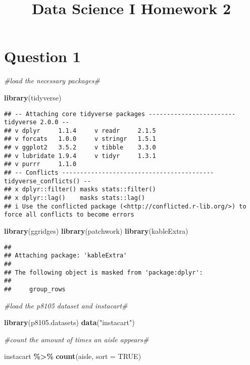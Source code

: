 \documentclass[
]{article}
\title{Data Science I Homework 2}
\author{}
\date{\vspace{-2.5em}}
\newenvironment{Shaded}{\begin{snugshade}}{\end{snugshade}}
\newcommand{\AttributeTok}[1]{\textcolor[rgb]{0.13,0.29,0.53}{#1}}
\newcommand{\CommentTok}[1]{\textcolor[rgb]{0.56,0.35,0.01}{\textit{#1}}}
\newcommand{\ConstantTok}[1]{\textcolor[rgb]{0.56,0.35,0.01}{#1}}
\newcommand{\FunctionTok}[1]{\textcolor[rgb]{0.13,0.29,0.53}{\textbf{#1}}}
\newcommand{\NormalTok}[1]{#1}
\newcommand{\SpecialCharTok}[1]{\textcolor[rgb]{0.81,0.36,0.00}{\textbf{#1}}}
\newcommand{\StringTok}[1]{\textcolor[rgb]{0.31,0.60,0.02}{#1}}
\begin{document}
\maketitle

\section{Question 1}\label{question-1}

\begin{Shaded}
\begin{Highlighting}[]
\CommentTok{\#load the necessary packages\#}

\FunctionTok{library}\NormalTok{(tidyverse)}
\end{Highlighting}
\end{Shaded}

\begin{verbatim}
## -- Attaching core tidyverse packages ------------------------ tidyverse 2.0.0 --
## v dplyr     1.1.4     v readr     2.1.5
## v forcats   1.0.0     v stringr   1.5.1
## v ggplot2   3.5.2     v tibble    3.3.0
## v lubridate 1.9.4     v tidyr     1.3.1
## v purrr     1.1.0     
## -- Conflicts ------------------------------------------ tidyverse_conflicts() --
## x dplyr::filter() masks stats::filter()
## x dplyr::lag()    masks stats::lag()
## i Use the conflicted package (<http://conflicted.r-lib.org/>) to force all conflicts to become errors
\end{verbatim}

\begin{Shaded}
\begin{Highlighting}[]
\FunctionTok{library}\NormalTok{(ggridges)}
\FunctionTok{library}\NormalTok{(patchwork)}
\FunctionTok{library}\NormalTok{(kableExtra)}
\end{Highlighting}
\end{Shaded}

\begin{verbatim}
## 
## Attaching package: 'kableExtra'
## 
## The following object is masked from 'package:dplyr':
## 
##     group_rows
\end{verbatim}

\begin{Shaded}
\begin{Highlighting}[]
\CommentTok{\#load the p8105 dataset and instacart\#}

\FunctionTok{library}\NormalTok{(p8105.datasets)}
\FunctionTok{data}\NormalTok{(}\StringTok{"instacart"}\NormalTok{)}

\CommentTok{\#count the amount of times an aisle appears\#}

\NormalTok{instacart }\SpecialCharTok{\%\textgreater{}\%} \FunctionTok{count}\NormalTok{(aisle, }\AttributeTok{sort =} \ConstantTok{TRUE}\NormalTok{)}
\end{Highlighting}
\end{Shaded}
\end{document}

